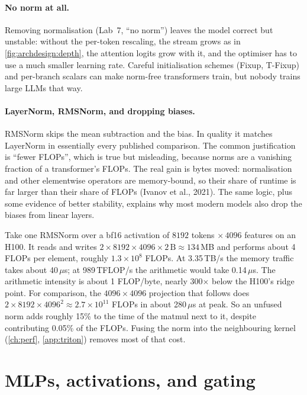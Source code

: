 \paragraph{No norm at all.} Removing normalisation (Lab~7, ``no norm'') leaves the model correct but
unstable: without the per-token rescaling, the stream grows as in \cref{fig:archdesign:depth}, the
attention logits grow with it, and the optimiser has to use a much smaller learning rate. Careful
initialisation schemes (Fixup, T-Fixup) and per-branch scalars can make norm-free transformers train,
but nobody trains large LLMs that way.

\paragraph{LayerNorm, RMSNorm, and dropping biases.} RMSNorm skips the mean subtraction and the bias.
In quality it matches LayerNorm in essentially every published comparison. The common justification is
``fewer FLOPs'', which is true but misleading, because norms are a vanishing fraction of a
transformer's FLOPs. The real gain is bytes moved: normalisation and other elementwise operators are
memory-bound, so their share of runtime is far larger than their share of FLOPs (Ivanov et al.,
2021). The same logic, plus some evidence of better stability, explains why most modern models also
drop the biases from linear layers.

\begin{napkinmath}
Take one RMSNorm over a bf16 activation of $8192$ tokens $\times\,4096$ features on an H100. It
reads and writes $2\times 8192\times4096\times2\,\text{B}\approx134$\,MB and performs about 4 FLOPs
per element, roughly $1.3\times10^8$ FLOPs. At 3.35\,TB/s the memory traffic takes about 40\,$\mu$s;
at 989\,TFLOP/s the arithmetic would take 0.14\,$\mu$s. The arithmetic intensity is about 1 FLOP/byte,
nearly 300$\times$ below the H100's ridge point. For comparison, the $4096\times4096$ projection that
follows does $2\times8192\times4096^2\approx2.7\times10^{11}$ FLOPs in about 280\,$\mu$s at peak. So
an unfused norm adds roughly 15\% to the time of the matmul next to it, despite contributing 0.05\% of
the FLOPs. Fusing the norm into the neighbouring kernel (\cref{ch:perf}, \cref{app:triton}) removes
most of that cost.
\end{napkinmath}

\section{MLPs, activations, and gating}\label{sec:archdesign:mlp}

